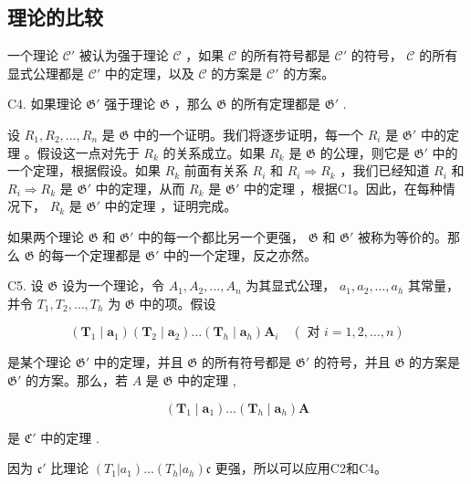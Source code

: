 \subsection{理论的比较}

一个理论 \(\mathcal{C}'\) 被认为强于理论 \(\mathcal{C}\) ，如果 \(\mathcal{C}\) 的所有符号都是 \(\mathcal{C}'\) 的符号， \(\mathcal{C}\) 的所有显式公理都是 \(\mathcal{C}'\) 中的定理，以及 \(\mathcal{C}\) 的方案是 \(\mathcal{C}'\) 的方案。

C4. 如果理论 \(\mathfrak{G}'\) 强于理论 \(\mathfrak{G}\) ，那么 \(\mathfrak{G}\) 的所有定理都是 \(\mathfrak{G}'\) .

设 \(R_1, R_2, \ldots, R_n\) 是 \(\mathfrak{G}\) 中的一个证明。我们将逐步证明，每一个 \(R_i\) 是 \(\mathfrak{G}'\) 中的定理 。假设这一点对先于 \(R_k\) 的关系成立。如果 \(R_k\) 是 \(\mathfrak{G}\) 的公理，则它是 \(\mathfrak{G}'\) 中的一个定理，根据假设。如果 \(R_k\) 前面有关系 \(R_i\) 和 \(R_i \Longrightarrow R_k\) ，我们已经知道 \(R_i\) 和 \(R_i \Longrightarrow R_k\) 是 \(\mathfrak{G}'\) 中的定理，从而 \(R_k\) 是 \(\mathfrak{G}'\) 中的定理 ，根据C1。因此，在每种情况下， \(R_k\) 是 \(\mathfrak{G}'\) 中的定理 ，证明完成。

如果两个理论 \(\mathfrak{G}\) 和 \(\mathfrak{G}'\) 中的每一个都比另一个更强， \(\mathfrak{G}\) 和 \(\mathfrak{G}'\) 被称为等价的。那么 \(\mathfrak{G}\) 的每一个定理都是 \(\mathfrak{G}'\) 中的一个定理，反之亦然。

C5. 设 \(\mathfrak{G}\) 设为一个理论，令 \(A_{1}, A_{2}, \ldots, A_{n}\) 为其显式公理， \(a_{1}, a_{2}, \ldots, a_{h}\) 其常量，并令 \(T_{1}, T_{2}, \ldots, T_{h}\) 为 \(\mathfrak{G}\) 中的项。假设

\[
\left(\boldsymbol {T} _ {1} \mid \boldsymbol {a} _ {1}\right) \left(\boldsymbol {T} _ {2} \mid \boldsymbol {a} _ {2}\right) \dots \left(\boldsymbol {T} _ {h} \mid \boldsymbol {a} _ {h}\right) \boldsymbol {A} _ {i} \quad (\text { 对 } i = 1, 2, \dots , n)
\]

是某个理论 \(\mathfrak{G}'\) 中的定理，并且 \(\mathfrak{G}\) 的所有符号都是 \(\mathfrak{G}'\) 的符号，并且 \(\mathfrak{G}\) 的方案是 \(\mathfrak{G}'\) 的方案。那么，若 \(A\) 是 \(\mathfrak{G}\) 中的定理 ,

\[
\left(\boldsymbol {T} _ {1} \mid \boldsymbol {a} _ {1}\right) \dots \left(\boldsymbol {T} _ {h} \mid \boldsymbol {a} _ {h}\right) \boldsymbol {A}
\]

是 \(\mathfrak{C}'\) 中的定理 .

因为 \(\mathfrak{c}'\) 比理论 \((T_1|a_1) \ldots (T_h|a_h)\mathfrak{c}\) 更强，所以可以应用C2和C4。

